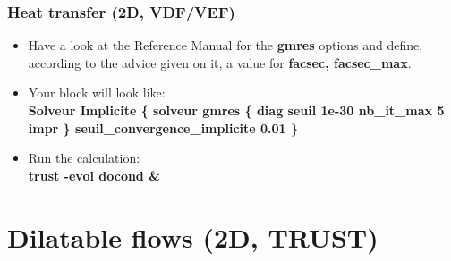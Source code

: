 \documentclass[10pt, hyperref={unicode=true,pdfusetitle, bookmarks=true,bookmarksnumbered=false,bookmarksopen=false, breaklinks=false,pdfborder={0 0l 1},backref=true,colorlinks=true,linkcolor=darkblue,pageanchor}]{beamer}
\begin{document}
\begin{frame}
\frametitle{Heat transfer (2D, VDF/VEF)}
\begin{block}{}

\begin{itemize}
\item Have a look at the Reference Manual for the \textbf{gmres} options and define, according to the advice given on it, a value for \textbf{facsec, facsec\_max}.

\item Your block will look like:\\
\textbf{Solveur Implicite \{ solveur gmres \{ diag seuil 1e-30 nb\_it\_max 5 impr \}  seuil\_convergence\_implicite 0.01  \} }

\item Run the calculation:\\
\textbf{trust -evol docond  \&}
\end{itemize}

\end{block}
\end{frame}



\section{{\bf{Dilatable flows (2D, TRUST)}}}
\end{document}

